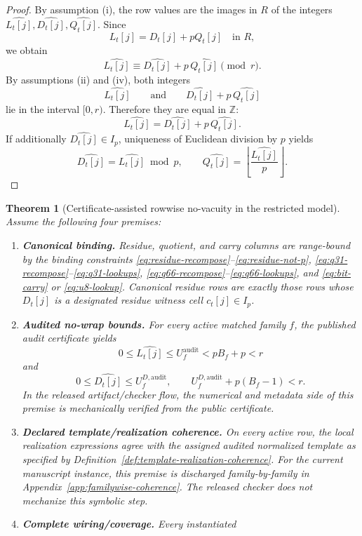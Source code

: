 ﻿\documentclass[11pt]{article}
\newtheorem{theorem}{Theorem}[section]
\newcommand{\Z}{\mathbb{Z}}
\newcommand{\wt}[1]{\widehat{#1}}
\begin{document}
\begin{proof}
By assumption (i), the row values are the images in \(R\) of the integers
\(\wt{L_t[j]},\wt{D_t[j]},\wt{Q_t[j]}\). Since
\[
L_t[j]=D_t[j]+pQ_t[j]\quad\text{in }R,
\]
we obtain
\[
\wt{L_t[j]} \equiv \wt{D_t[j]} + p\,\wt{Q_t[j]} \pmod r.
\]
By assumptions (ii) and (iv), both integers
\[
\wt{L_t[j]}
\qquad\text{and}\qquad
\wt{D_t[j]} + p\,\wt{Q_t[j]}
\]
lie in the interval \([0,r)\). Therefore they are equal in \(\Z\):
\[
\wt{L_t[j]}=\wt{D_t[j]}+p\,\wt{Q_t[j]}.
\]
If additionally \(\wt{D_t[j]}\in I_p\), uniqueness of Euclidean division by
\(p\) yields
\[
\wt{D_t[j]}=\wt{L_t[j]}\bmod p,
\qquad
\wt{Q_t[j]}=\left\lfloor\frac{\wt{L_t[j]}}{p}\right\rfloor.
\]
\end{proof}

\begin{theorem}[Certificate-assisted rowwise no-vacuity in the restricted model]
\label{thm:rowwise-no-vacuity}
Assume the following four premises:
\begin{enumerate}[label=(\Alph*),leftmargin=2em]
    \item \textbf{Canonical binding.} Residue, quotient, and carry columns are
    range-bound by the binding constraints
    \eqref{eq:residue-recompose}--\eqref{eq:residue-not-p},
    \eqref{eq:q31-recompose}--\eqref{eq:q31-lookups},
    \eqref{eq:q66-recompose}--\eqref{eq:q66-lookups}, and
    \eqref{eq:bit-carry} or \eqref{eq:u8-lookup}. Canonical residue rows are
    exactly those rows whose \(D_t[j]\) is a designated residue witness cell
    \(c_t[j]\in I_p\).
    \item \textbf{Audited no-wrap bounds.} For every active matched family \(f\),
    the published audit certificate yields
    \[
    0\le \wt{L_t[j]}\le U_f^{\mathrm{audit}} < pB_f+p<r
    \]
    and
    \[
    0\le \wt{D_t[j]}\le U_f^{D,\mathrm{audit}},
    \qquad
    U_f^{D,\mathrm{audit}}+p(B_f-1)<r.
    \]
    In the released artifact/checker flow, the numerical and metadata side of
    this premise is mechanically verified from the public certificate.
    \item \textbf{Declared template/realization coherence.} On every active row,
    the local realization expressions agree with the assigned audited normalized
    template as specified by Definition~\ref{def:template-realization-coherence}.
    For the current manuscript instance, this premise is discharged family-by-family
    in Appendix~\ref{app:familywise-coherence}. The released checker does not
    mechanize this symbolic step.
    \item \textbf{Complete wiring/coverage.} Every instantiated

\end{enumerate}
\end{theorem}
\end{document}
